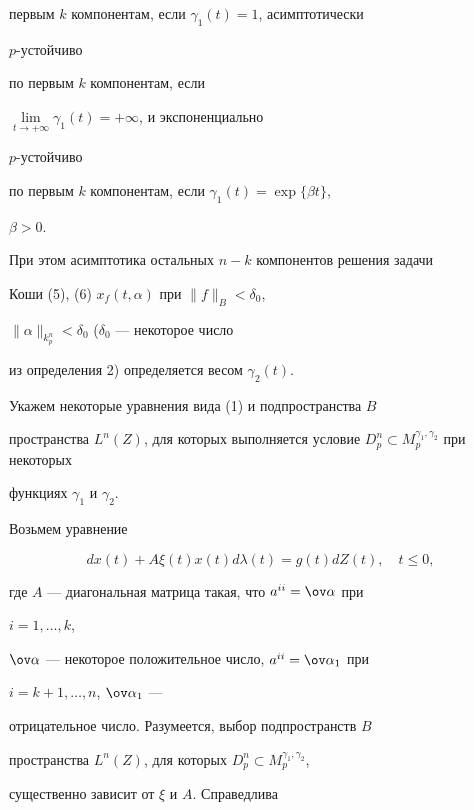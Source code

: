 первым $k$ компонентам, если $\gamma_1(t)=1$, асимптотически 


$p$-устойчиво 


по первым $k$ компонентам, если 


$\lim\limits_{t\to+\infty}\gamma_1(t)=+\infty$, и экспоненциально 


$p$-устойчиво 


по первым $k$ компонентам, если $\gamma_1(t)=\exp\{\beta t\}$, 


$\beta>0$. 


При этом асимптотика остальных $n{-}k$ компонентов решения задачи 


Коши (5), (6) $x_f(t,\alpha)$ при $\|f\|_B<\delta_0$, 


$\|\alpha\|_{k^n_p}<\delta_0$ ($\delta_0$ --- некоторое число 


из определения 2) определяется весом $\gamma_2(t)$. 


 


Укажем некоторые уравнения вида (1) и подпространства $B$ 


пространства $L^n(Z)$, для которых выполняется условие $D^n_p\subset 


M^{\gamma_1,\gamma_2}_p$ при некоторых 


функциях $\gamma_1$ и $\gamma_2$. 


 


Возьмем уравнение


\begin{equation} 


d x(t)+A\xi(t)x(t)d\lambda(t)=g(t)d Z(t),\quad t\le0, 


\end{equation} 


где $A$ --- диагональная матрица такая, что $a^{ii}=\ov\alpha$ при 


$i=1,\dotsc,k$, 


$\ov\alpha$ --- некоторое положительное число, $a^{ii}=\ov\alpha_1$ при 


$i=k+1,\dotsc,n$, $\ov\alpha_1$ --- 


отрицательное число. Разумеется, выбор подпространств $B$ 


пространства $L^n(Z)$, для которых $D^n_p\subset 


M^{\gamma_1,\gamma_2}_p$, 


существенно зависит от $\xi$ и $A$. Справедлива 


